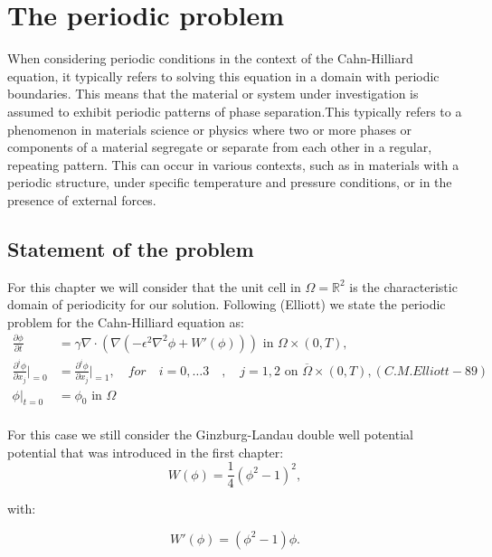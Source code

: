 \documentclass{article}
\begin{document}
\section{The periodic problem}
 When considering periodic conditions in the context of the Cahn-Hilliard equation, it typically refers to solving this equation in a domain with periodic boundaries. This means that the material or system under investigation is assumed to exhibit periodic patterns of phase separation.This typically refers to a phenomenon in materials science or physics where two or more phases or components of a material segregate or separate from each other in a regular, repeating pattern. This can occur in various contexts, such as in materials with a periodic structure, under specific temperature and pressure conditions, or in the presence of external forces. 
        
\subsection{Statement of the problem}

For this chapter we will consider that the unit cell in $\Omega = \mathbb{R}^2$ is the characteristic domain of periodicity for our solution. Following (Elliott) we state the periodic problem for the Cahn-Hilliard equation as:\\

\begin{align}
\frac{\partial\phi}{\partial t} &= \gamma \nabla \cdot \left(\nabla \left(-\epsilon^2 \nabla^2 \phi +  W'(\phi)\right)\right) \text{ in } \Omega \times (0, T), \\
\frac{\partial^i \phi}{\partial x_j}|_{=0} &= \frac{\partial^i \phi}{\partial x_j}|_{=1}, \quad for\quad i=0,\dots 3\quad,\quad j=1,2 \text{ on } \overline{\Omega} \times (0, T), (C.M.Elliott-89) \\
\phi|_{t=0} &= \phi_0 \text{ in } \Omega
\end{align}\\


For this case we still consider the Ginzburg-Landau double well potential potential that was introduced in the first chapter:\\


\begin{equation}
W(\phi) = \frac{1}{4}(\phi^2 - 1)^2,
\end{equation}

with:

\begin{equation}
W'(\phi) = (\phi^2 - 1)\phi.
\end{equation}\\
\end{document}
